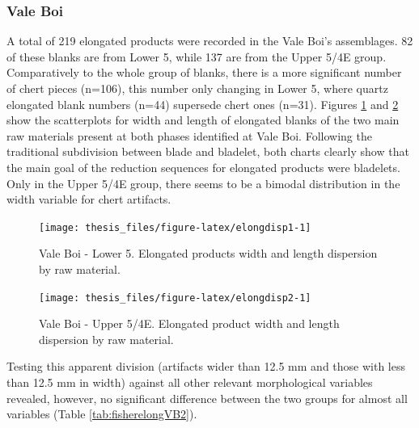 \documentclass[12pt,twoside]{reedthesis}
\begin{document}
\hypertarget{vale-boi-6}{%
\subsubsection{Vale Boi}\label{vale-boi-6}}

A total of 219 elongated products were recorded in the Vale Boi's assemblages. 82 of these blanks are from Lower 5, while 137 are from the Upper 5/4E group. Comparatively to the whole group of blanks, there is a more significant number of chert pieces (n=106), this number only changing in Lower 5, where quartz elongated blank numbers (n=44) supersede chert ones (n=31). Figures \ref{fig:elongdisp1} and \ref{fig:elongdisp2} show the scatterplots for width and length of elongated blanks of the two main raw materials present at both phases identified at Vale Boi. Following the traditional subdivision between blade and bladelet, both charts clearly show that the main goal of the reduction sequences for elongated products were bladelets. Only in the Upper 5/4E group, there seems to be a bimodal distribution in the width variable for chert artifacts.
\begin{figure}[H]

{\centering \texttt{[image: thesis\_files/figure-latex/elongdisp1-1]} 

}

\caption{Vale Boi - Lower 5. Elongated products width and length dispersion by raw material.}\label{fig:elongdisp1}
\end{figure}
\begin{figure}[H]

{\centering \texttt{[image: thesis\_files/figure-latex/elongdisp2-1]} 

}

\caption{Vale Boi - Upper 5/4E. Elongated product width and length dispersion by raw material.}\label{fig:elongdisp2}
\end{figure}
Testing this apparent division (artifacts wider than 12.5 mm and those with less than 12.5 mm in width) against all other relevant morphological variables revealed, however, no significant difference between the two groups for almost all variables (Table \ref{tab:fisherelongVB2}).
\end{document}
